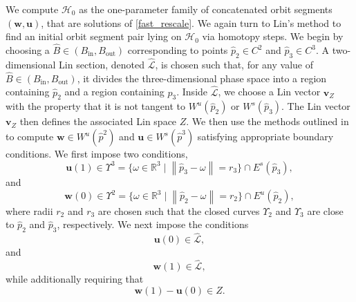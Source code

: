 \documentclass{ws-ijbc}
\begin{document}
We compute $\mathscr{H}_0$ as the one-parameter family of concatenated orbit segments $(\mathbf{w}, \mathbf{u})$, that are solutions of \eqref{fast_rescale}.  We again turn to Lin's method to find an initial orbit segment pair lying on $\mathscr{H}_0$ via homotopy steps.  We begin by choosing a $\widehat{B} \in (B_{\text{in}}, B_{\text{out}})$ corresponding to points $\widehat{p}_2 \in C^2$ and $\widehat{p}_3 \in C^3$.  A two-dimensional Lin section, denoted $\widehat{\mathscr{L}}$, is chosen such that, for any value of $\widehat{B} \in (B_{\text{in}}, B_{\text{out}})$, it divides the three-dimensional phase space into a region containing $\widehat{p}_2$ and a region containing $\widehat{p}_3$.  Inside $\widehat{\mathscr{L}}$, we choose a Lin vector $\mathbf{v}_Z$ with the property that it is not tangent to $W^u(\widehat{p}_2)$ or $W^s(\widehat{p}_3)$.  The Lin vector $\mathbf{v}_Z$ then defines the associated Lin space $Z$.    We then use the methods outlined in \cite{Red_book} to compute $\mathbf{w} \in W^u(\widehat{p}^2)$ and $\mathbf{u} \in W^s(\widehat{p}^3)$ satisfying appropriate boundary conditions.  We first impose two conditions,
%
\begin{equation}
	\mathbf{u}(1) \in \Upsilon^3= \{ \omega \in \mathbb{R}^3  \; | \; \left\lVert \widehat{p}_3 - \omega \right\lVert = r_3 \} \cap E^s(\widehat{p}_3),
	\label{general_conditions_heteroclinic_singular_1}
\end{equation}
%
and
%
\begin{equation}
	\mathbf{w}(0) \in \Upsilon^2= \{ \omega \in \mathbb{R}^3  \; | \; \left\lVert \widehat{p}_2 - \omega \right\lVert = r_2 \} \cap E^u(\widehat{p}_2),
	\label{general_conditions_heteroclinic_singular_2}
\end{equation}
%
where radii $r_2$ and $r_3$ are chosen such that the closed curves $\Upsilon_2$ and $\Upsilon_3$ are close to $\widehat{p}_2$ and $\widehat{p}_3$, respectively.  We next impose the conditions
%
\begin{equation}
	\mathbf{u}(0) \in \widehat{\mathscr{L}},
	\label{general_conditions_heteroclinic_singular_3}
\end{equation}
%
and
%
\begin{equation}
	\mathbf{w}(1) \in \widehat{\mathscr{L}},
	\label{general_conditions_heteroclinic_singular_4}
\end{equation}
%
while additionally requiring that
%
\begin{equation*}
	\mathbf{w}(1)-\mathbf{u}(0) \in Z.
\end{equation*}
%
\end{document}
